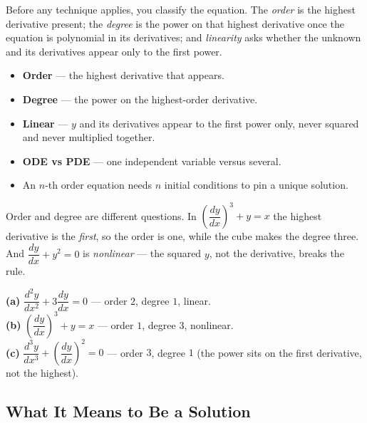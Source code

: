 \documentclass[11pt]{article}
\begin{document}
Before any technique applies, you classify the equation. The \emph{order} is the
highest derivative present; the \emph{degree} is the power on that highest
derivative once the equation is polynomial in its derivatives; and
\emph{linearity} asks whether the unknown and its derivatives appear only to the
first power.

\begin{formulabox}
\begin{itemize}[leftmargin=1.4em, itemsep=2pt]
    \item \textbf{Order} --- the highest derivative that appears.
    \item \textbf{Degree} --- the power on the highest-order derivative.
    \item \textbf{Linear} --- $y$ and its derivatives appear to the first power
          only, never squared and never multiplied together.
    \item \textbf{ODE vs PDE} --- one independent variable versus several.
    \item An $n$-th order equation needs $n$ initial conditions to pin a unique
          solution.
\end{itemize}
\end{formulabox}

\begin{warningbox}
Order and degree are different questions. In $\left(\dfrac{dy}{dx}\right)^{3} + y
= x$ the highest derivative is the \emph{first}, so the order is one, while the
cube makes the degree three. And $\dfrac{dy}{dx} + y^{2} = 0$ is
\emph{nonlinear} --- the squared $y$, not the derivative, breaks the rule.
\end{warningbox}

\begin{examplebox}
\textbf{(a)} $\dfrac{d^{2}y}{dx^{2}} + 3\dfrac{dy}{dx} = 0$ --- order $2$,
degree $1$, linear.\\
\textbf{(b)} $\left(\dfrac{dy}{dx}\right)^{3} + y = x$ --- order $1$, degree $3$,
nonlinear.\\
\textbf{(c)} $\dfrac{d^{3}y}{dx^{3}} + \left(\dfrac{dy}{dx}\right)^{2} = 0$ ---
order $3$, degree $1$ (the power sits on the first derivative, not the highest).
\end{examplebox}

\subsection{What It Means to Be a Solution}
\end{document}
